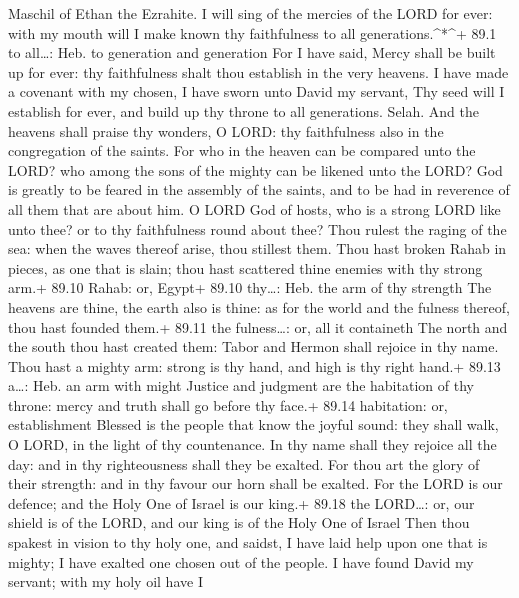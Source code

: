 Maschil of Ethan the Ezrahite.  I will sing of the mercies
of the LORD for ever: with my mouth will I make known thy faithfulness
to all generations.\^{}*\^{}+ 89.1 to all\ldots: Heb. to generation and
generation  For I have said, Mercy shall be built up for
ever: thy faithfulness shalt thou establish in the very heavens.
 I have made a covenant with my chosen, I have sworn unto
David my servant,  Thy seed will I establish for ever, and
build up thy throne to all generations. Selah.  And the
heavens shall praise thy wonders, O LORD: thy faithfulness also in the
congregation of the saints.  For who in the heaven can be
compared unto the LORD? who among the sons of the mighty can be likened
unto the LORD?  God is greatly to be feared in the assembly
of the saints, and to be had in reverence of all them that are about
him.  O LORD God of hosts, who is a strong LORD like unto
thee? or to thy faithfulness round about thee?  Thou rulest
the raging of the sea: when the waves thereof arise, thou stillest them.
 Thou hast broken Rahab in pieces, as one that is slain;
thou hast scattered thine enemies with thy strong arm.+ 89.10 Rahab: or,
Egypt+ 89.10 thy\ldots: Heb. the arm of thy strength  The
heavens are thine, the earth also is thine: as for the world and the
fulness thereof, thou hast founded them.+ 89.11 the fulness\ldots: or,
all it containeth  The north and the south thou hast
created them: Tabor and Hermon shall rejoice in thy name. 
Thou hast a mighty arm: strong is thy hand, and high is thy right hand.+
89.13 a\ldots: Heb. an arm with might  Justice and judgment
are the habitation of thy throne: mercy and truth shall go before thy
face.+ 89.14 habitation: or, establishment  Blessed is the
people that know the joyful sound: they shall walk, O LORD, in the light
of thy countenance.  In thy name shall they rejoice all the
day: and in thy righteousness shall they be exalted.  For
thou art the glory of their strength: and in thy favour our horn shall
be exalted.  For the LORD is our defence; and the Holy One
of Israel is our king.+ 89.18 the LORD\ldots: or, our shield is of the
LORD, and our king is of the Holy One of Israel  Then thou
spakest in vision to thy holy one, and saidst, I have laid help upon one
that is mighty; I have exalted one chosen out of the people.
 I have found David my servant; with my holy oil have I
